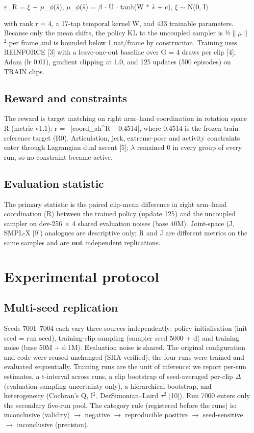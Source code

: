 \documentclass[conference]{IEEEtran}
\begin{document}
\begin{center}$\varepsilon$\_R = $\xi$ + $\mu$\_$\phi$($\hat{s}$),   $\mu$\_$\phi$($\hat{s}$) = $\beta$ $\cdot$ U $\cdot$ tanh(W $\ast$ $\hat{s}$ + c),   $\xi$ $\sim$ N(0, I)\end{center}
with rank r = 4, a 17-tap temporal kernel W, and 433 trainable parameters. Because only the mean shifts, the policy KL to the uncoupled sampler is ½$\|$$\mu$$\|$$^2$ per frame and is bounded below 1 nat/frame by construction. Training uses REINFORCE [3] with a leave-one-out baseline over G = 4 draws per clip [4], Adam (lr 0.01), gradient clipping at 1.0, and 125 updates (500 episodes) on TRAIN clips.

\subsection{Reward and constraints}
The reward is target matching on right arm--hand coordination in rotation space R (metric v1.1): r = --|coord\_ah\textasciicircum{}R -- 0.4514|, where 0.4514 is the frozen train-reference target (R0). Articulation, jerk, extreme-pose and activity constraints enter through Lagrangian dual ascent [5]; $\lambda$ remained 0 in every group of every run, so no constraint became active.

\subsection{Evaluation statistic}
The primary statistic is the paired clip-mean difference in right arm--hand coordination (R) between the trained policy (update 125) and the uncoupled sampler on dev-256 $\times$ 4 shared evaluation noises (base 40M). Joint-space (J, SMPL-X [9]) analogues are descriptive only; R and J are different metrics on the same samples and are \textbf{not} independent replications.

\section{Experimental protocol}
\subsection{Multi-seed replication}
Seeds 7001--7004 each vary three sources independently: policy initialisation (init seed = run seed), training-clip sampling (sampler seed 5000 + d) and training noise (base 50M + d$\cdot$1M). Evaluation noise is shared. The original configuration and code were reused unchanged (SHA-verified); the four runs were trained and evaluated sequentially. Training runs are the unit of inference: we report per-run estimates, a t-interval across runs, a clip bootstrap of seed-averaged per-clip $\Delta$ (evaluation-sampling uncertainty only), a hierarchical bootstrap, and heterogeneity (Cochran's Q, I$^2$, DerSimonian--Laird $\tau$$^2$ [10]). Run 7000 enters only the secondary five-run pool. The category rule (registered before the runs) is: inconclusive (validity) $\rightarrow$ negative $\rightarrow$ reproducible positive $\rightarrow$ seed-sensitive $\rightarrow$ inconclusive (precision).
\end{document}

